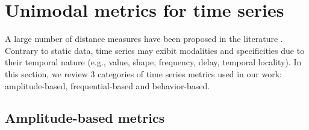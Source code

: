 \section{Unimodal metrics for time series}

A large number of distance measures have been proposed in the literature \cite{Montero2014}. Contrary to static data, time series may exibit modalities and specificities due to their temporal nature (e.g., value, shape, frequency, delay, temporal locality). In this section, we review 3 categories of time series metrics used in our work: amplitude-based, frequential-based and behavior-based.



%




\subsection{Amplitude-based metrics}
\label{sec:TSmetrics}

